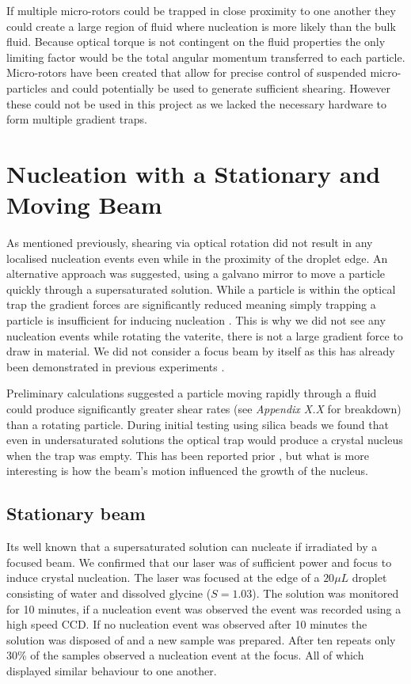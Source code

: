 If multiple micro-rotors could be trapped in close proximity 
to one another they could create a large region of fluid where 
nucleation is more likely than the bulk fluid. Because optical
torque is not contingent on the fluid properties the only 
limiting factor would be the total angular momentum transferred 
to each particle. Micro-rotors have been created that allow for 
precise control of suspended micro-particles \cite{Butaite2019} 
and could potentially be used to generate sufficient shearing. 
However these could not be used in this project as we lacked the 
necessary hardware to form multiple gradient traps.  
\section{Nucleation with a Stationary and Moving Beam}
As mentioned previously, shearing via optical rotation did 
not result in any localised nucleation events even while 
in the proximity of the droplet edge. An alternative approach
was suggested, using a galvano mirror to move a particle 
quickly through a supersaturated solution. While a particle
is within the optical trap the gradient forces are 
significantly reduced meaning simply trapping a particle is
insufficient for inducing nucleation \cite{Flannigan2023}. 
This is why we did not see any nucleation events while 
rotating the vaterite, there is not a large gradient force
to draw in material. We did not consider a focus beam by 
itself as this has already been demonstrated in previous
experiments \cite{Flannigan2023, Liao2022, Rungsimanon2010}.

Preliminary calculations suggested a particle moving rapidly
through a fluid could produce significantly greater shear 
rates (see \emph{Appendix X.X} for breakdown) than a rotating 
particle. During initial testing using silica beads we found 
that even in undersaturated solutions the optical trap would 
produce a crystal nucleus when the trap was empty. This has 
been reported prior \cite{Rungsimanon2010, Liao2022}, but 
what is more interesting is how the beam's motion influenced 
the growth of the nucleus.

\subsection{Stationary beam}
\label{sec:stationary}
Its well known that a supersaturated solution can nucleate
if irradiated by a focused beam. We confirmed that our 
laser was of sufficient power and focus to induce crystal
nucleation. The laser was focused at the edge of a $20\mu L$
droplet consisting of water and dissolved glycine ($S=1.03$). 
The solution was monitored for 10 minutes, if a nucleation 
event was observed the event was recorded using a high speed 
CCD. If no nucleation event was observed after 10 minutes 
the solution was disposed of and a new sample was prepared. 
After ten repeats only 30\% of the samples observed a 
nucleation event at the focus. All of which displayed similar 
behaviour to one another.

